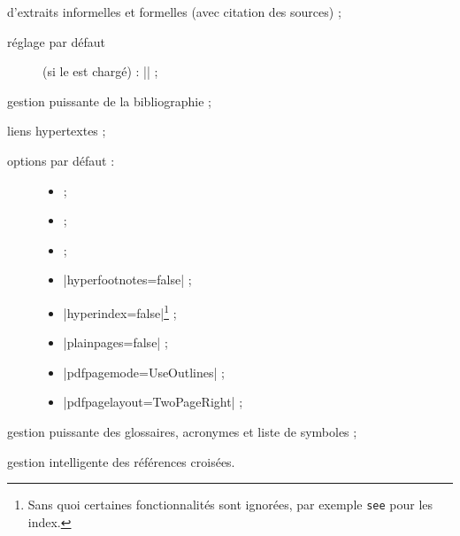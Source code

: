 \begin{description}
  d'extraits informelles et formelles (avec citation des sources) ;
    \begin{description}
    \item[réglage par défaut] (si le  est chargé) :
      |\SetCiteCommand{\autocite}| ;
  \end{description}
\item[\package{biblatex} :] gestion puissante de la bibliographie ;
\item[\package{hyperref} :] %
  liens hypertextes ;
  \begin{description}
  \item[options par défaut :]\leavevmode{}
    \begin{itemize}
    \item {} ;
    \item {} ;
    \item {} ;
    \item |hyperfootnotes=false| ;
    \item |hyperindex=false|\footnote{Sans quoi certaines fonctionnalités sont
        ignorées, par exemple \protect\lstinline+see+ pour les index.} ;
    \item |plainpages=false| ;
    \item |pdfpagemode=UseOutlines| ;
    \item |pdfpagelayout=TwoPageRight| ;
    \end{itemize}
  \end{description}
\item[\package{glossaries-extra} :] gestion puissante des glossaires, acronymes et liste de symboles ;
\item[\package{cleveref} :] gestion
  intelligente des références croisées.
\end{description}

